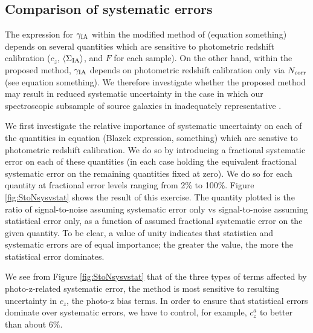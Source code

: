 \documentclass[a4paper,fleqn,usenatbib,useAMS]{mnras}
\begin{document}
\subsection{Comparison of systematic errors}
\label{subsec:sysresults}
\noindent
The expression for $\gamma_{\rm IA}$ within the modified method of \cite{Blazek2012} (equation something) depends on several quantities which are sensitive to photometric redshift calibration ($c_z$, $\langle \Sigma_{\rm IA} \rangle$, and $F$ for each sample). On the other hand, within the proposed method, $\gamma_{\rm IA}$ depends on photometric redshift calibration only via $N_{\rm corr}$ (see equation something). We therefore investigate whether the proposed method may result in reduced systematic uncertainty in the case in which our spectroscopic subsample of source galaxies in inadequately representative . 

We first investigate the relative importance of systematic uncertainty on each of the quantities in equation (Blazek expression, something) which are senstive to photometric redshift calibration. We do so by introducing a fractional systematic error on each of these quantities (in each case holding the equivalent fractional systematic error on the remaining quantities fixed at zero). We do so for each quantity at fractional error levels ranging from 2\% to 100\%. Figure \ref{fig:StoNsysvstat} shows the result of this exercise. The quantity plotted is the ratio of signal-to-noise assuming systematic error only vs signal-to-noise assuming statistical error only, as a function of assumed fractional systematic error on the given quantity. To be clear, a value of unity indicates that statistica and systematic errors are of equal importance; the greater the value, the more the statistical error dominates.

We see from Figure \ref{fig:StoNsysvstat} that of the three types of terms affected by photo-z-related systematic error, the method is most sensitive to resulting uncertainty in $c_z$, the photo-z bias terms. In order to ensure that statistical errors dominate over systematic errors, we have to control, for example, $c_z^a$ to better than about $6\%$. 
\end{document}
